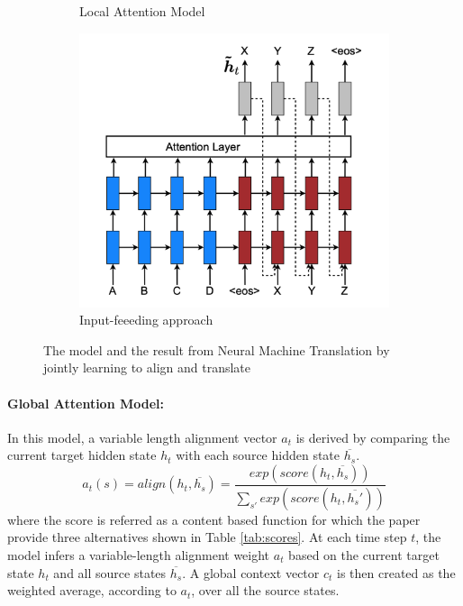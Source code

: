 \documentclass{article}
\begin{document}
\begin{figure}
\begin{subfigure}{0.3\textwidth}
			\caption{Local Attention Model}
		\end{subfigure}
		\hspace{\fill}
		\begin{subfigure}{0.3\textwidth}
			\label{fig:iofeed}
			\centering
			\includegraphics[width=1\textwidth]{fig/iofeed.png}
			\caption{Input-feeeding approach}
		\end{subfigure}
		\caption{The model and the result from Neural Machine Translation by jointly learning to align and translate}
		\label{fig:luong}
	\end{figure}
	
	\paragraph{Global Attention Model: } In this model, a variable length alignment vector \(a_t\) is derived by comparing the current target hidden state \(h_t\) with each source hidden state \(\overline{h_s}\). 
	\[a_t(s) = align(h_t,\overline{h_s}) = \frac{exp(score(h_t, \overline{h_s}))}{\sum_{s'} exp(score(h_t, \overline{h_s'}))}\]
	where the score is referred as a content based function for which the paper provide three alternatives shown in Table \ref{tab:scores}. At each time step \(t\), the model infers a variable-length alignment weight \(a_t\) based on the current target state \(h_t\) and all source states \(\overline{h_s}\). A global context vector \(c_t\) is then created as the weighted average, according to \(a_t\), over all the source states.
\end{document}

